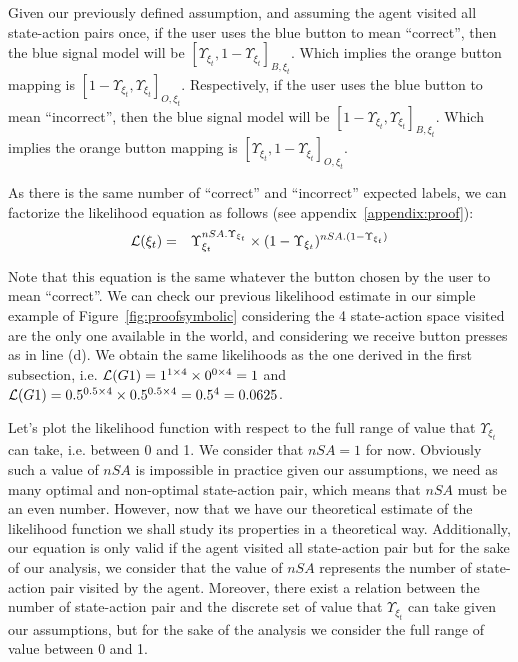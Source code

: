Given our previously defined assumption, and assuming the agent visited all state-action pairs once, if the user uses the blue button to mean ``correct'', then the blue signal model will be $[\Upsilon_{\xi_t},1-\Upsilon_{\xi_t}]_{B,\xi_t}$. Which implies the orange button mapping is $[1-\Upsilon_{\xi_t},\Upsilon_{\xi_t}]_{O,\xi_t}$. Respectively, if the user uses the blue button to mean ``incorrect'', then the blue signal model will be $[1-\Upsilon_{\xi_t},\Upsilon_{\xi_t}]_{B,\xi_t}$. Which implies the orange button mapping is $[\Upsilon_{\xi_t},1-\Upsilon_{\xi_t}]_{O,\xi_t}$. 

As there is the same number of ``correct'' and ``incorrect'' expected labels, we can factorize the likelihood equation as follows (see appendix~\ref{appendix:proof}):
%
\begin{eqnarray}
\mathcal{L}(\xi_t) &=& \Upsilon_{\xi_t}^{nSA.\Upsilon_{\xi_t}} \times (1-\Upsilon_{\xi_t})^{nSA.(1-\Upsilon_{\xi_t})}
\label{eq:likelihoodproof}
\end{eqnarray}

Note that this equation is the same whatever the button chosen by the user to mean ``correct''. We can check our previous likelihood estimate in our simple example of Figure~\ref{fig:proofsymbolic} considering the 4 state-action space visited are the only one available in the world, and considering we receive button presses as in line (d). We obtain the same likelihoods as the one derived in the first subsection, i.e. $\mathcal{L}(G1) = 1^{1\times4} \times 0^{0\times4} = 1$ and $\mathcal{L}(G1) = 0.5^{0.5\times4} \times 0.5^{0.5\times4} = 0.5^4 = 0.0625$.

Let's plot the likelihood function with respect to the full range of value that $\Upsilon_{\xi_t}$ can take, i.e. between 0 and 1. We consider that $nSA = 1$ for now. Obviously such a value of $nSA$ is impossible in practice given our assumptions, we need as many optimal and non-optimal state-action pair, which means that $nSA$ must be an even number. However, now that we have our theoretical estimate of the likelihood function we shall study its properties in a theoretical way. Additionally, our equation is only valid if the agent visited all state-action pair but for the sake of our analysis, we consider that the value of $nSA$ represents the number of state-action pair visited by the agent. Moreover, there exist a relation between the number of state-action pair and the discrete set of value that $\Upsilon_{\xi_t}$ can take given our assumptions, but for the sake of the analysis we consider the full range of value between 0 and 1.

